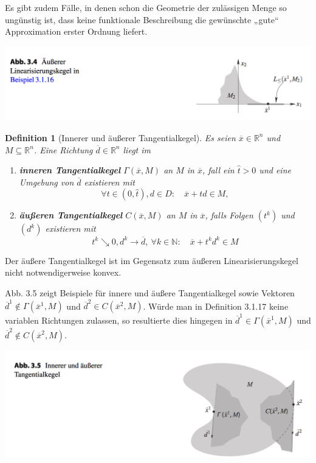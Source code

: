 \documentclass[11pt]{scrreprt}
\newcounter{thm}
\theoremstyle{thmstyle}
\numberwithin{thm}{section}
\newtheorem{definition}[thm]{Definition}
\begin{document}
Es gibt zudem Fälle, in denen schon die Geometrie der zulässigen Menge so ungünstig ist, dass keine funktionale Beschreibung die gewünschte „gute“ Approximation erster Ordnung liefert.

\begin{center}
	\includegraphics[scale=0.5]{ab34}
\end{center}

\begin{definition}[Innerer und äußerer Tangentialkegel]
	Es seien $\overline{x} \in \mathbb{R}^n$ und $M \subseteq \mathbb{R}^n$. Eine Richtung $\overline{d} \in \mathbb{R}^n$ liegt im
	\begin{enumerate}[label=\alph*\upshape)]
		\item \textbf{inneren Tangentialkegel} $\Gamma(\overline{x}, M)$ an $M$ in $\overline{x}$, fall ein $\hat{t} > 0$ und eine Umgebung von $\overline{d}$ existieren mit 
			$$ \forall t \in (0, \hat{t}), d \in D: \quad \overline{x} +td \in M, $$
		\item \textbf{äußeren Tangentialkegel} $C(\overline{x}, M)$ an $M$ in $\overline{x}$, falls Folgen $(t^k)$ und $(d^k)$ existieren mit
			$$ t^k \searrow 0, d^k \rightarrow \overline{d}, ~\forall k \in \mathbb{N}: \quad \overline{x} + t^k d^k \in M $$
	\end{enumerate}	
\end{definition}

Der äußere Tangentialkegel ist im Gegensatz zum äußeren Linearisierungskegel nicht notwendigerweise konvex.

Abb. 3.5 zeigt Beispiele für innere und äußere Tangentialkegel sowie Vektoren $\overline{d}^1 \notin \Gamma(\overline{x}^1, M)$ und $\overline{d}^2 \in C(\overline{x}^2, M)$. Würde man in Definition 3.1.17 keine variablen Richtungen zulassen, so resultierte dies hingegen in $\overline{d}^1 \in \Gamma(\overline{x}^1, M)$ und $\overline{d}^2 \notin C(\overline{x}^2, M)$.

\begin{center}
	\includegraphics[scale=0.5]{ab35}
\end{center}
\end{document}

